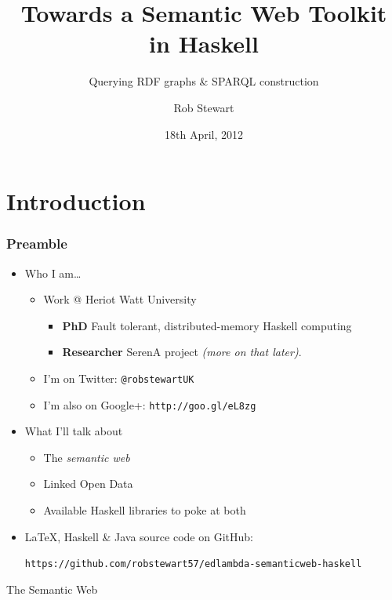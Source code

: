 \documentclass{beamer}
\author{Rob Stewart}
\institute{Heriot Watt University}
\title{Towards a Semantic Web Toolkit in Haskell}
\date{18th April, 2012}
\subtitle{Querying RDF graphs \& SPARQL construction}
\begin{document}
\section{Introduction}

\maketitle

\begin{frame}[fragile]
\frametitle{Preamble}

\begin{itemize}
\item Who I am\ldots
  
  \begin{itemize}
  \item Work @ Heriot Watt University
    
    \begin{itemize}
    \item \textbf{PhD} Fault tolerant, distributed-memory Haskell computing
    \item \textbf{Researcher} SerenA project \emph{(more on that later)}.
    \end{itemize}
    
  \item I'm on Twitter: \texttt{@robstewartUK}
  \item I'm also on Google+: \texttt{http://goo.gl/eL8zg}
    
  \end{itemize}
  
\bigskip
\item What I'll talk about
  
  \begin{itemize}
  \item The \emph{semantic web}
  \item Linked Open Data
  \item Available Haskell libraries to poke at both
  \end{itemize}

\bigskip
\item LaTeX, Haskell \& Java source code on GitHub:

\small
\texttt{https://github.com/robstewart57/edlambda-semanticweb-haskell}
  
\end{itemize}

\end{frame}


\begin{frame}

\huge
\begin{center}
The Semantic Web
\end{center}

\end{frame}
\end{document}
